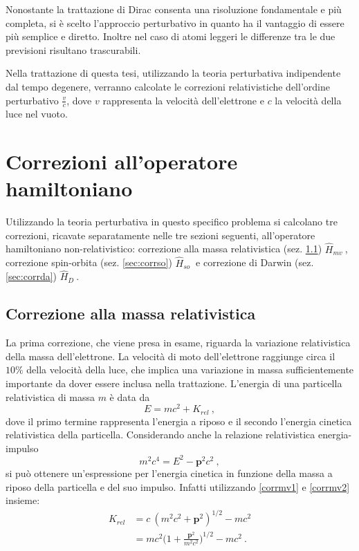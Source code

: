 \documentclass[12pt,a4paper]{report}
\numberwithin{equation}{section}
\numberwithin{section}{chapter}
\begin{document}
	Nonostante la trattazione di Dirac consenta una risoluzione fondamentale e pi\`u completa, si \`e scelto l'approccio perturbativo in quanto ha il vantaggio di essere pi\`u semplice e diretto. Inoltre nel caso di atomi leggeri le differenze tra le due previsioni risultano trascurabili.
	
	Nella trattazione di questa tesi, utilizzando la teoria perturbativa indipendente dal tempo degenere, verranno calcolate le correzioni relativistiche dell'ordine perturbativo $\frac{v}{c}$, dove $v$ rappresenta la velocit\`a dell'elettrone e $c$ la velocit\`a della luce nel vuoto.
	\pagebreak
	\hypersetup{pageanchor=true}
	
\chapter{Correzioni all'operatore hamiltoniano}\label{cha:corr}

	Utilizzando la teoria perturbativa in questo specifico problema si calcolano tre correzioni, ricavate separatamente nelle tre sezioni seguenti, all'operatore hamiltoniano non-relativistico: correzione alla massa relativistica (sez. \ref{sec:corrmv}) $\widehat{H}_{mv}~$, correzione spin-orbita (sez. \ref{sec:corrso}) $\widehat{H}_{so}~$ e correzione di Darwin (sez. \ref{sec:corrda}) $\widehat{H}_{D}~$. 
	
\section{Correzione alla massa relativistica}\label{sec:corrmv}

	La prima correzione, che viene presa in esame, riguarda la variazione relativistica della massa dell'elettrone. La velocit\`a di moto dell'elettrone raggiunge circa il $10\%$ della velocit\`a della luce, che implica una variazione in massa sufficientemente importante da dover essere inclusa nella trattazione. L'energia di una particella relativistica di massa $m$ \`e data da
	\begin{equation}
	\label{corrmv1}
	E = mc^2 + K_{rel} ~,
	\end{equation}
	dove il primo termine rappresenta l'energia a riposo e il secondo l'energia cinetica relativistica della particella. Considerando anche la relazione relativistica energia-impulso
	\begin{equation}
	\label{corrmv2}
	m^2c^4 = E^2 - \boldsymbol{p}^2c^2 ~,
	\end{equation}
	si pu\`o ottenere un'espressione per l'energia cinetica in funzione della massa a riposo della particella e del suo impulso. Infatti utilizzando \eqref{corrmv1} e \eqref{corrmv2} insieme:
	\begin{align}
	\label{corrmv3}
	K_{rel}& = c~(m^2c^2 + \boldsymbol{p}^2)^{1/2} - mc^2\\
	& = mc^2\bigg(1+\frac{\boldsymbol{p}^2}{m^2c^2}\bigg)^{1/2} - mc^2 ~.\nonumber
	\end{align}
	
\end{document}
